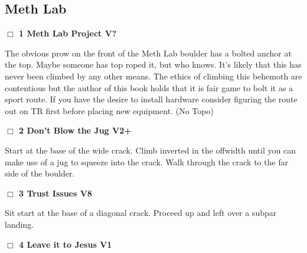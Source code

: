 	\begin{multicols}{2}

\needspace{10em}
\subsection*{Meth Lab}\label{bf:Meth Lab}




\needspace{2em}
\label{rt:Meth Lab Project}
\colorbox{black!20}{
\parbox{0.95\linewidth}{
\hspace{-1ex}\textbf{$\Box$
1 Meth Lab Project V?  \warn\warn\warn
}}}
\begin{adjustwidth}{1.3em}{}			

The obvious prow on the front of the Meth Lab boulder has a bolted anchor at the top. Maybe someone has top roped it, but who knows. It's likely that this has never been climbed by any other means. The ethics of climbing this behemoth are contentious but the author of this book holds that it is fair game to bolt it as a sport route. If you have the desire to install hardware consider figuring the route out on TR first before placing new equipment.
  (No Topo)
\end{adjustwidth}




\needspace{2em}
\label{rt:Don't Blow the Jug}
\colorbox{green!20}{
\parbox{0.95\linewidth}{
\hspace{-1ex}\textbf{$\Box$
2 Don't Blow the Jug V2+  \warn
}}}
\begin{adjustwidth}{1.3em}{}			

Start at the base of the wide crack. Climb inverted in the offwidth until you can make use of a jug to squeeze into the crack. Walk through the crack to the far side of the boulder.
\end{adjustwidth}




\needspace{2em}
\label{rt:Trust Issues}
\colorbox{Goldenrod!20}{
\parbox{0.95\linewidth}{
\hspace{-1ex}\textbf{$\Box$
3 Trust Issues V8  \warn\warn
}}}
\begin{adjustwidth}{1.3em}{}			

Sit start at the base of a diagonal crack. Proceed up and left over a subpar landing.
\end{adjustwidth}




\needspace{2em}
\label{rt:Leave it to Jesus}
\colorbox{green!20}{
\parbox{0.95\linewidth}{
\hspace{-1ex}\textbf{$\Box$
4 Leave it to Jesus V1  
}}}
\begin{adjustwidth}{1.3em}{}			


\end{adjustwidth}
\end{multicols}
